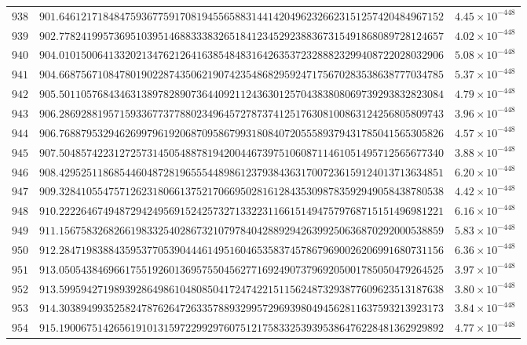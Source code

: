 \documentclass[12pt,reqno]{amsart}
\theoremstyle{remark}
\begin{document}
\begin{longtable}{clc}
$938$ & $901.6461217184847593677591708194556588314414204962326623151257420484967152$ & $4.45\times 10^{-448}$ \\
$939$ & $902.7782419957369510395146883338326518412345292388367315491868089728124657$ & $4.02\times 10^{-448}$ \\
$940$ & $904.0101500641332021347621264163854848316426353723288823299408722028032906$ & $5.08\times 10^{-448}$ \\
$941$ & $904.6687567108478019022874350621907423548682959247175670283538638777034785$ & $5.37\times 10^{-448}$ \\
$942$ & $905.5011057684346313897828907364409211243630125704383808069739293832823084$ & $4.79\times 10^{-448}$ \\
$943$ & $906.2869288195715933677377880234964572787374125176308100863124256805809743$ & $3.96\times 10^{-448}$ \\
$944$ & $906.7688795329462699796192068709586799318084072055589379431785041565305826$ & $4.57\times 10^{-448}$ \\
$945$ & $907.5048574223127257314505488781942004467397510608711461051495712565677340$ & $3.88\times 10^{-448}$ \\
$946$ & $908.4295251186854460487281965554489861237938436317007236159124013713634851$ & $6.20\times 10^{-448}$ \\
$947$ & $909.3284105547571262318066137521706695028161284353098783592949058438780538$ & $4.42\times 10^{-448}$ \\
$948$ & $910.2222646749487294249569152425732713322311661514947579768715151496981221$ & $6.16\times 10^{-448}$ \\
$949$ & $911.1567583268266198332540286732107978404288929426399250636870292000538859$ & $5.83\times 10^{-448}$ \\
$950$ & $912.2847198388435953770539044461495160465358374578679690026206991680731156$ & $6.36\times 10^{-448}$ \\
$951$ & $913.0505438469661755192601369575504562771692490737969205001785050479264525$ & $3.97\times 10^{-448}$ \\
$952$ & $913.5995942719893928649861048085041724742215115624873293877609623513187638$ & $3.80\times 10^{-448}$ \\
$953$ & $914.3038949935258247876264726335788932995729693980494562811637593213923173$ & $3.84\times 10^{-448}$ \\
$954$ & $915.1900675142656191013159722992976075121758332539395386476228481362929892$ & $4.77\times 10^{-448}$ \\

\end{longtable}
\end{document}
